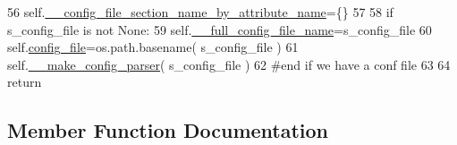 \begin{DoxyCode}
56         self.\hyperlink{classnegui_1_1pginputsimupop_1_1PGInputSimuPop_acd9740f17e53a6e471d4e85565962369}{\_\_config\_file\_section\_name\_by\_attribute\_name}=\{\}
57 
58         \textcolor{keywordflow}{if} s\_config\_file \textcolor{keywordflow}{is} \textcolor{keywordflow}{not} \textcolor{keywordtype}{None}:
59             self.\hyperlink{classnegui_1_1pginputsimupop_1_1PGInputSimuPop_ad7c3feef55c16989a35f56c3e0d9943e}{\_\_full\_config\_file\_name}=s\_config\_file
60             self.\hyperlink{classnegui_1_1pginputsimupop_1_1PGInputSimuPop_af82bde7e564aee524fc30f2e06fde934}{config\_file}=os.path.basename( s\_config\_file )
61             self.\hyperlink{classnegui_1_1pginputsimupop_1_1PGInputSimuPop_a0b34c99730e86de268c5503ed226d15e}{\_\_make\_config\_parser}( s\_config\_file )
62         \textcolor{comment}{#end if we have a conf file}
63 
64         \textcolor{keywordflow}{return}
\end{DoxyCode}


\subsection{Member Function Documentation}
